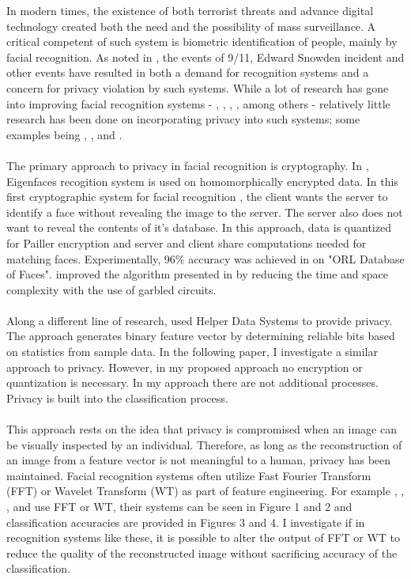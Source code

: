 \documentclass{article}
\begin{document}
In modern times, the existence of both terrorist threats and advance digital technology created both the need and the possibility of mass surveillance. A critical competent of such system is biometric identification of people, mainly by facial recognition. As noted in \cite{bowyer2004face}, the events of 9/11, Edward Snowden incident and other events have resulted in both a demand for recognition systems and a concern for privacy violation by such systems. While a lot of research has gone into improving facial recognition systems - \cite{bouzalmat2014comparative}, \cite{spies2000face}, \cite{bouzalmat2011facial}, 
\cite{dehai2013pca}, \cite{samra2003face} among others - relatively little research has been done on incorporating privacy into such systems; some examples being \cite{erkin2009privacy}, \cite{sadeghi2010efficient}, and \cite{kevenaar2005face}.    
\\\\
The primary approach to privacy in facial recognition is cryptography. In \cite{erkin2009privacy}, Eigenfaces recogition system is used on homomorphically encrypted data. In this first cryptographic system for facial recognition \cite{erkin2009privacy}, the client wants the server to identify a face without revealing the image to the server. 
The server also does not want to reveal the contents of it's database. In this approach, data is quantized for Pailler encryption and server and client share computations needed for matching faces. \cite{erkin2009privacy} Experimentally, 96\% accuracy was achieved in \cite{erkin2009privacy} on "ORL Database of Faces". \cite{sadeghi2010efficient} improved the algorithm presented in \cite{erkin2009privacy} by reducing the time and space complexity with the use of garbled circuits. 
\\\\
Along a different line of research, \cite{kevenaar2005face} used Helper Data Systems to provide privacy. The approach generates binary feature vector by determining reliable bits based on statistics from sample data. In the following paper, I investigate a similar approach to privacy. However, in my proposed approach no encryption or quantization is necessary. In my approach there are not additional processes. Privacy is built into the classification process. 
\\\\
This approach rests on the idea that privacy is compromised when an image can be visually inspected by an individual. Therefore, as long as the reconstruction of an image from a feature vector is not meaningful to a human, privacy has been maintained. Facial recognition systems often utilize Fast Fourier Transform (FFT) or Wavelet Transform (WT) as part of feature engineering. For example \cite{spies2000face}, \cite{bouzalmat2011facial}, 
\cite{dehai2013pca}, and \cite{samra2003face} use FFT or WT, their systems can be seen in Figure 1 and 2 and classification accuracies are provided in Figures 3 and 4. I investigate if in recognition systems like these, it is possible to alter the output of FFT or WT to reduce the quality of the reconstructed image without sacrificing accuracy of the classification.           
\end{document}
